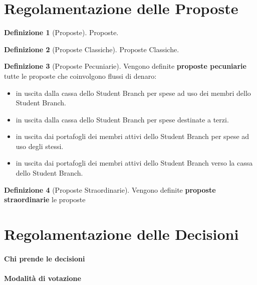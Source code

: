 \documentclass[pdf]{article}
\theoremstyle{definition}
\newtheorem{defn}{Definizione}[section]
\begin{document}
\section{Regolamentazione delle Proposte}


\begin{defn}[Proposte]
	Proposte.
\end{defn}

\begin{defn}[Proposte Classiche]
	Proposte Classiche.
\end{defn}

\begin{defn}[Proposte Pecuniarie]
	Vengono definite \textbf{proposte pecuniarie} tutte le proposte che coinvolgono flussi di denaro:
	\begin{itemize}
		\item in uscita dalla cassa dello Student Branch per spese ad uso dei membri dello Student Branch.
		\item in uscita dalla cassa dello Student Branch per spese destinate a terzi.
		\item in uscita dai portafogli dei membri attivi dello Student Branch per spese ad uso degli stessi. %
		\item in uscita dai portafogli dei membri attivi dello Student Branch verso la cassa dello Student Branch.
	\end{itemize}
\end{defn}

\begin{defn}[Proposte Straordinarie]
	Vengono definite \textbf{proposte straordinarie} le proposte
\end{defn}


\section{Regolamentazione delle Decisioni}

\paragraph{Chi prende le decisioni}

\paragraph{Modalità di votazione}
\end{document}
